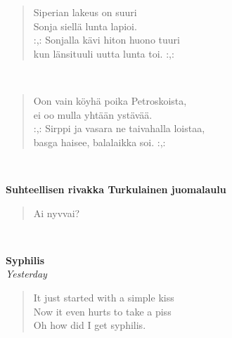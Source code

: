 \noindent\begin{minipage}{\linewidth}
\begin{verse}
	Siperian lakeus on suuri\\
	Sonja siellä lunta lapioi.\\
	\hspace{0pt-\widthof{:,: }}:,: Sonjalla kävi hiton huono tuuri\\
	kun länsituuli uutta lunta toi. :,:\\
\end{verse}
\end{minipage}\\[10pt]
\noindent\begin{minipage}{\linewidth}
\begin{verse}
	Oon vain köyhä poika Petroskoista,\\
	ei oo mulla yhtään ystävää.\\
	\hspace{0pt-\widthof{:,: }}:,: Sirppi ja vasara ne taivahalla loistaa,\\
	basga haisee, balalaikka soi. :,:\\
\end{verse}
\end{minipage}\\[10pt]
%
%
\noindent\begin{minipage}{\linewidth}
\vspace{5pt}
\parbox[t]{0.85\linewidth}{\raggedright {\large\bf Suhteellisen rivakka Turkulainen juomalaulu}\\[6pt]}
\begin{verse}
	Ai nyvvai?\\
\end{verse}
\end{minipage}\\[10pt]
%
%
\noindent\begin{minipage}{\linewidth}
\vspace{5pt}
\parbox[t]{0.85\linewidth}{\raggedright {\large\bf Syphilis}\\[2pt]\small\emph{Yesterday}\\[6pt]}
\begin{verse}
	
	It just started with a simple kiss\\
	Now it even hurts to take a piss\\
	Oh how did I get syphilis.\\
\end{verse}
\end{minipage}\\[10pt]
